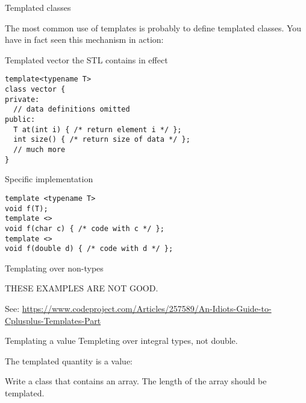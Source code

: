  {Templated classes}

The most common use of templates is probably to define templated
classes.
You have in fact seen this mechanism in action:
\begin{block}{Templated vector}
  \label{sl:template-vector}
  the \ac{STL} contains
  in effect
\begin{verbatim}
template<typename T>
class vector {
private:
  // data definitions omitted
public:
  T at(int i) { /* return element i */ };
  int size() { /* return size of data */ };
  // much more
}
\end{verbatim}
\end{block}

 {Specific implementation}

\begin{verbatim}
template <typename T>
void f(T);
template <> 
void f(char c) { /* code with c */ };
template <>
void f(double d) { /* code with d */ };
\end{verbatim}

 {Templating over non-types}

THESE EXAMPLES ARE NOT GOOD.

See:
\url{https://www.codeproject.com/Articles/257589/An-Idiots-Guide-to-Cplusplus-Templates-Part}

\begin{block}{Templating a value}
  Templeting over integral types, not double.

  The templated quantity is a value:
\end{block}

\begin{exercise}
  Write a class that contains an array. The length of the array should
  be templated.
\end{exercise}
